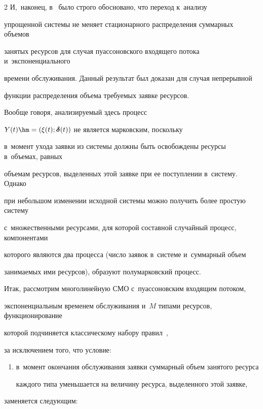 \begin{multicols}{2}
И,~наконец, в~\cite{Naumov_3_2016} было строго обосновано, что переход к~анализу 


упрощенной сис\-те\-мы не меняет стационарного распределения суммарных объемов 


занятых ресурсов для случая пуассоновского входящего потока и~экспоненциального 


времени обслуживания. Данный результат был доказан для случая непрерывной 


функции распределения объема требуемых заявке ресурсов.


Вообще говоря, анализируемый здесь процесс 


$Y(t)\hm=(\xi(t);\boldsymbol{\delta}(t))$ не является марковским, поскольку 


в~момент ухода заявки из сис\-те\-мы должны быть освобождены ресурсы в~объемах, равных 


объемам ресурсов, выделенных этой заявке при ее поступлении в~сис\-те\-му. Однако 


при небольшом изменении исходной системы можно получить более простую систему 


с~множественными ресурсами, для которой составной случайный процесс, компонентами 


которого являются два процесса (число заявок в~сис\-те\-ме и~суммарный объем 


занимаемых ими ресурсов), образуют полумарковский процесс.





Итак, рассмотрим многолинейную СМО с~пуассоновским входящим потоком, 


экспоненциальным временем обслуживания и~$M$ типами ресурсов, функционирование 


которой подчиняется классическому набору правил~\cite{Ch_1},


за исключением того, что условие:


\begin{enumerate}


\item[] в~момент окончания обслуживания заявки суммарный объем занятого ресурса 


каждого типа уменьшается на величину ресурса, выделенного этой заявке,


\end{enumerate}


заменяется следующим:


\begin{enumerate}



\end{enumerate}
\end{multicols}
